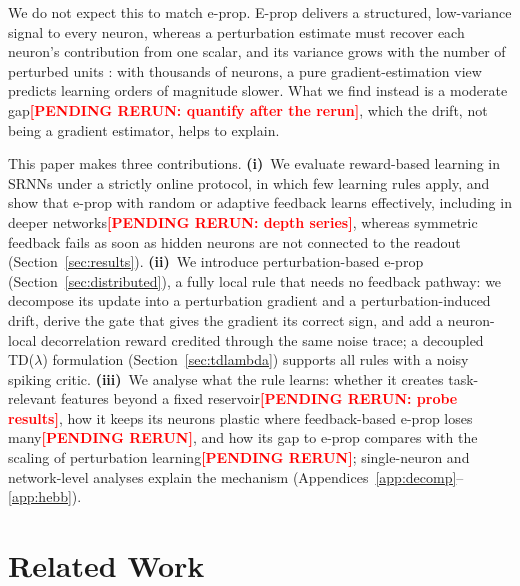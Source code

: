 \documentclass[10pt,twocolumn]{article}
\newcommand{\pending}[1]{\textcolor{red}{\bfseries[PENDING RERUN#1]}}
\newcommand{\method}{perturbation-based e-prop}   %
\begin{document}
We do not expect this to match e-prop. E-prop delivers a structured, low-variance
signal to every neuron, whereas a perturbation estimate must recover each neuron's
contribution from one scalar, and its variance grows with the number of perturbed
units \citep{Werfel2005LearningCurves,fiete2006gradient}: with thousands of neurons, a
pure gradient-estimation view predicts learning orders of magnitude slower. What we
find instead is a moderate gap\pending{: quantify after the rerun}, which the drift,
not being a gradient estimator, helps to explain.

This paper makes three contributions. \textbf{(i)}~We evaluate reward-based learning
in SRNNs under a strictly online protocol, in which few learning rules
apply, and show that e-prop with random or adaptive feedback learns effectively,
including in deeper networks\pending{: depth series}, whereas symmetric feedback fails
as soon as hidden neurons are not connected to the readout
(Section~\ref{sec:results}). \textbf{(ii)}~We introduce \method{}
(Section~\ref{sec:distributed}), a fully local rule that needs no feedback pathway: we
decompose its update into a perturbation gradient and a perturbation-induced drift,
derive the gate that gives the gradient its correct sign, and add a neuron-local
decorrelation reward credited through the same noise trace; a decoupled TD($\lambda$) formulation
(Section~\ref{sec:tdlambda}) supports all rules with a noisy spiking critic.
\textbf{(iii)}~We analyse what the rule learns: whether it creates task-relevant
features beyond a fixed reservoir\pending{: probe results}, how it keeps its neurons
plastic where feedback-based e-prop loses many\pending{}, and how its gap to e-prop
compares with the scaling of perturbation learning\pending{}; single-neuron and
network-level analyses explain the mechanism (Appendices~\ref{app:decomp}--\ref{app:hebb}).


\section{Related Work}
\label{sec:related}
\end{document}
